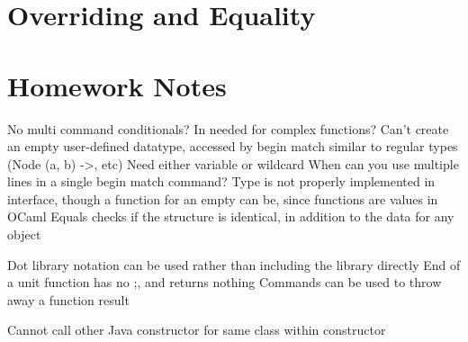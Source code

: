 \documentclass[11 pt, twoside]{article}
\newenvironment{outline*}
{
	\begin{outline}[enumerate]
	}
	{\end{outline}
}
\begin{document}
\section{Overriding and Equality}
\begin{outline*}
\1 
\end{outline*}
\section{Homework Notes}
\begin{outline*}
\1 No multi command conditionals?
\1 In needed for complex functions?
\1 Can't create an empty user-defined datatype, accessed by begin match similar to regular types (Node (a, b) ->, etc)
\1 Need either variable or wildcard
\1 When can you use multiple lines in a single begin match command?
\1 Type is not properly implemented in interface, though a function for an empty can be, since functions are values in OCaml
\1 Equals checks if the structure is identical, in addition to the data for any object

\1 Dot library notation can be used rather than including the library directly
\1 End of a unit function has no ;, and returns nothing
\1 Commands can be used to throw away a function result

\1 Cannot call other Java constructor for same class within constructor
\end{outline*}
\end{document}
